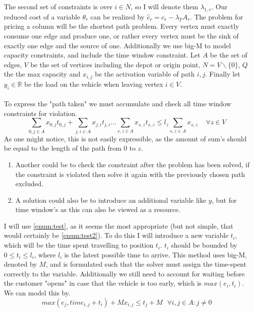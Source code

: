 \documentclass{article}
\begin{document}
    The second set of constraints is over $i \in N$, so I will denote them $\lambda_{1, r}$.
    Our reduced cost of a variable $\theta_r$ can be realized by $\hat{c}_r = c_r - \lambda_T A_r$.
    The problem for pricing a column will be the shortest path problem.
    Every vertex must exactly consume one edge and produce one, or rather every vertex must be the sink of exactly one edge and the source of one.
    Additionally we use big-M to model capacity constraints, and include the time window constraint.
    Let $A$ be the set of edges, $V$ be the set of vertices including the depot or origin point, $N = V \backslash \{ 0 \}$, $Q$ the the max capacity and $x_{i,j}$ be the activation variable of path $i,j$.
    Finally let $y_i \in \mathbb{R}$ be the load on the vehicle when leaving vertex $i \in V$.\\\\
    To express the "path taken" we must accumulate and check all time window constraints for violation.
    \[
        \sum_{0, j \in A} x_{0, j} t_{0, j} + \sum_{j, i \in A} x_{j, i} t_{j, i} \dots \sum_{s, z \in A} x_{s, z} t_{s, z} \leq l_z \sum_{s, z \in A} x_{s, z} \,\,\,\,\,\,\, \forall z \in V
    \]
    As one might notice, this is not easily expressible, as the amount of sum's should be equal to the length of the path from $0$ to $z$.
    \begin{enumerate}
        \item\label{enum:test2} Another could be to check the constraint after the problem has been solved, if the constraint is violated then solve it again with the previously chosen path excluded.
        \item\label{enum:test} A solution could also be to introduce an additional variable like $y$, but for time window's as this can also be viewed as a resource.
    \end{enumerate}
    I will use \autoref{enum:test}, as it seems the most appropriate (but not simple, that would certainly be \autoref{enum:test2}).
    To do this I will introduce a new variable $t_i$, which will be the time spent travelling to position $t_i$.
    $t_i$ should be bounded by $0 \leq t_i \leq l_i$, where $l_i$ is the latest possible time to arrive.
    This method uses big-M, denoted by $M$, and is formulated such that the solver must assign the time-spent correctly to the variable.
    Additionally we still need to account for waiting before the customer "opens" in case that the vehicle is too early, which is $max(e_i, t_i)$.
    We can model this by.
    \[
        max(e_j, time_{i,j} + t_i) + Mx_{i,j} \leq t_j + M \,\,\,\, \forall i,j \in A: j \neq 0
    \]
\end{document}
